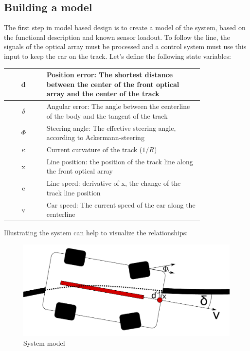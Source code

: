 \subsection{Building a model}

The first step in model based design is to create a model of the system, based on the functional description and known sensor loadout. To follow the line, the signals of the optical array must be processed and a control system must use this input to keep the car on the track. Let's define the following state variables:

\begin{center}
  \begin{tabular}{| c | p{0.8\linewidth} |}
\hline
    d & Position error: The shortest distance between the center of the front optical array and the center of the track \\ \hline
    $ \delta $ & Angular error: The angle between the centerline of the body and the tangent of the track \\ \hline
    $ \Phi $ & Steering angle: The effective steering angle, according to Ackermann-steering \\
    \hline
    $ \kappa $ & Current curvature of the track ($1/R$) \\ \hline
    x & Line position: the position of the track line along the front optical array \\ \hline
    c & Line speed: derivative of x, the change of the track line position \\ \hline
    v & Car speed: The current speed of the car along the centerline \\
    \hline
  \end{tabular}
\end{center}

Illustrating the system can help to visualize the relationships:

\begin{figure}[!ht]
    \centering
    \includegraphics[width=\linewidth]{img/cartop}
    \caption{System model}
    \label{fig:cartop}
\end{figure}

